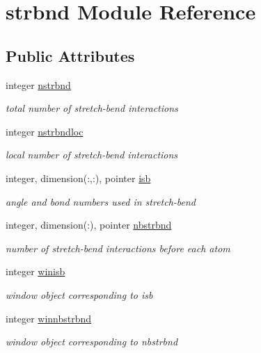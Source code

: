 \hypertarget{classstrbnd}{\section{strbnd Module Reference}
\label{classstrbnd}
}
\subsection*{Public Attributes}
\begin{DoxyCompactItemize}
\item 
integer \hyperlink{classstrbnd_a95508a01d4f20af68cf9d9223416a16f}{nstrbnd}
\begin{DoxyCompactList}\small\item\em total number of stretch-\/bend interactions \end{DoxyCompactList}\item 
integer \hyperlink{classstrbnd_a73019a5225f63308e25165f0e7c5733d}{nstrbndloc}
\begin{DoxyCompactList}\small\item\em local number of stretch-\/bend interactions \end{DoxyCompactList}\item 
integer, dimension(\-:,\-:), pointer \hyperlink{classstrbnd_ad98da9d62a5eeda5a4fa8e1451568454}{isb}
\begin{DoxyCompactList}\small\item\em angle and bond numbers used in stretch-\/bend \end{DoxyCompactList}\item 
integer, dimension(\-:), pointer \hyperlink{classstrbnd_a626e1921cc286ea042a4c4f179082fd0}{nbstrbnd}
\begin{DoxyCompactList}\small\item\em number of stretch-\/bend interactions before each atom \end{DoxyCompactList}\item 
integer \hyperlink{classstrbnd_a72cc543333b4b1d2f2db634e7d3f9827}{winisb}
\begin{DoxyCompactList}\small\item\em window object corresponding to isb \end{DoxyCompactList}\item 
integer \hyperlink{classstrbnd_a55f2ae82aee68ac7afa009bda39faf42}{winnbstrbnd}
\begin{DoxyCompactList}\small\item\em window object corresponding to nbstrbnd \end{DoxyCompactList}\item 

\end{DoxyCompactItemize}
